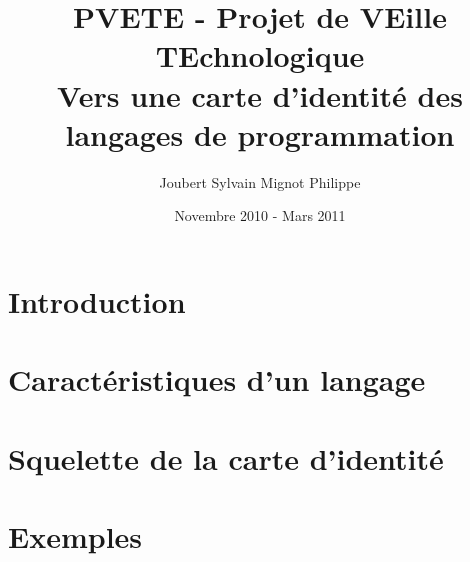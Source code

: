 \documentclass[a4paper, 11pt]{article}
\title{PVETE - Projet de VEille TEchnologique\\Vers une carte d'identité des
langages de programmation}
\author{{\sc Joubert} Sylvain \hspace{1cm} {\sc Mignot} Philippe}
\date{Novembre 2010 - Mars 2011}
\begin{document}

\begin{titlepage}
\maketitle
\end{titlepage}

\tableofcontents
\newpage

\section{Introduction}
\section{Caractéristiques d'un langage}
\section{Squelette de la carte d'identité}
\section{Exemples}
\end{document}
